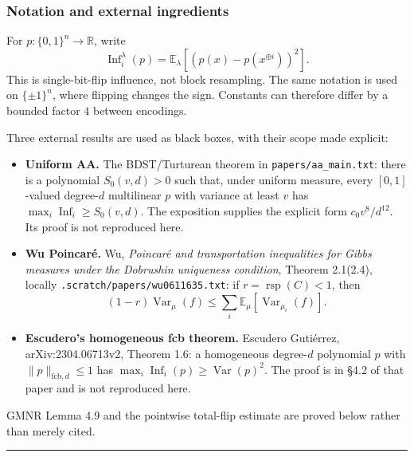 \subsubsection{Notation and external ingredients}\label{notation-and-external-ingredients}

For \(p:\{0,1\}^n\to\mathbb R\), write
\[
\operatorname{Inf}_i^\lambda(p)=\mathbb E_\lambda[(p(x)-p(x^{\oplus i}))^2].
\]
This is single-bit-flip influence, not block resampling. The same notation is used on \(\{\pm1\}^n\), where flipping changes the sign. Constants can therefore differ by a bounded factor \(4\) between encodings.

Three external results are used as black boxes, with their scope made explicit:

\begin{itemize}
\tightlist
\item
  \textbf{Uniform AA.} The BDST/Turturean theorem in \texttt{papers/aa\_main.txt}: there is a polynomial \(S_0(v,d)>0\) such that, under uniform measure, every \([0,1]\)-valued degree-\(d\) multilinear \(p\) with variance at least \(v\) has \(\max_i\operatorname{Inf}_i\ge S_0(v,d)\). The exposition supplies the explicit form \(c_0v^8/d^{12}\). Its proof is not reproduced here.
\item
  \textbf{Wu Poincaré.} Wu, \emph{Poincaré and transportation inequalities for Gibbs measures under the Dobrushin uniqueness condition}, Theorem 2.1(2.4), locally \texttt{.scratch/papers/wu0611635.txt}: if \(r=\operatorname{rsp}(C)<1\), then
  \[(1-r)\operatorname{Var}_\mu(f)\le\sum_i\mathbb E_\mu[\operatorname{Var}_{\mu_i}(f)].\]
\item
  \textbf{Escudero's homogeneous fcb theorem.} Escudero Gutiérrez, arXiv:2304.06713v2, Theorem 1.6: a homogeneous degree-\(d\) polynomial \(p\) with \(\|p\|_{\mathrm{fcb},d}\le1\) has \(\max_i\operatorname{Inf}_i(p)\ge\operatorname{Var}(p)^2\). The proof is in §4.2 of that paper and is not reproduced here.
\end{itemize}

GMNR Lemma 4.9 and the pointwise total-flip estimate are proved below rather than merely cited.

\begin{center}\rule{0.5\linewidth}{0.5pt}\end{center}
